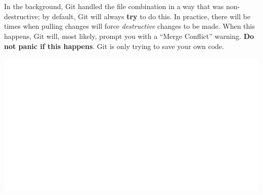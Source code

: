 \documentclass[12pt, letter]{article}
\begin{document}
    \\ \\
    In the background, Git handled the file combination in a way that was non-destructive; by default, Git will always \textbf{try} to do this. In practice, there will be times when pulling changes will force \emph{destructive} changes to be made. When this happens, Git will, most likely, prompt you with a ``Merge Conflict'' warning. \textbf{Do not panic if this happens}. Git is only trying to save your own code.

    \includegraphics{screenshots/shot015.bmp}
\end{document}
